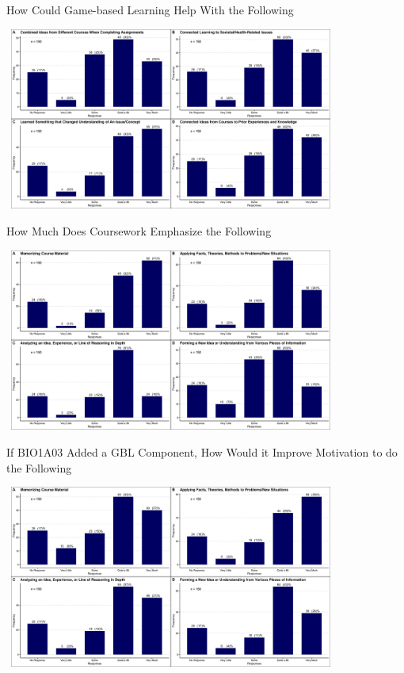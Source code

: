 \documentclass{beamer}
\begin{document}
	\begin{frame}{How Could Game-based Learning Help With the Following}
		\begin{center}
			\includegraphics[width=11cm, height=6cm]{how_does_gbl_help_in_science.jpg}
		\end{center}
	\end{frame}

	\begin{frame}{How Much Does Coursework Emphasize the Following}
		\begin{center}
			\includegraphics[width=11cm, height=6cm]{howmuch_coursework_emphasized_thefollowing.jpg}
		\end{center}
	\end{frame}

	\begin{frame}{If BIO1A03 Added a GBL Component, How Would it Improve Motivation to do the Following}
		\begin{center}
			\includegraphics[width=11cm, height=6cm]{ifbio1a03_added_gblcomponent.jpg}
		\end{center}
	\end{frame}
\end{document}

